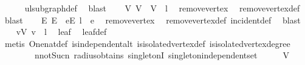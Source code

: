 \begin{isabellebody}
\ \ \ \ \isamarkupfalse%
\ ulsubgraph{\isacharunderscore}{\kern0pt}def\ \isamarkupfalse%
\ blast\isanewline
\ \ \isamarkupfalse%
\ V{\isacharprime}{\kern0pt}{\isacharcolon}{\kern0pt}\ {\isachardoublequoteopen}V{\isacharprime}{\kern0pt}\ {\isacharequal}{\kern0pt}\ V\ {\isacharminus}{\kern0pt}\ {\isacharbraceleft}{\kern0pt}l{\isacharbraceright}{\kern0pt}{\isachardoublequoteclose}\ \isamarkupfalse%
\ remove{\isacharunderscore}{\kern0pt}vertex\ \isamarkupfalse%
\ remove{\isacharunderscore}{\kern0pt}vertex{\isacharunderscore}{\kern0pt}def\ \isamarkupfalse%
\ blast\isanewline
\ \ \isamarkupfalse%
\ E{\isacharprime}{\kern0pt}{\isacharcolon}{\kern0pt}\ {\isachardoublequoteopen}E{\isacharprime}{\kern0pt}\ {\isacharequal}{\kern0pt}\ {\isacharbraceleft}{\kern0pt}e{\isasymin}E{\isachardot}{\kern0pt}\ l\ {\isasymnotin}\ e{\isacharbraceright}{\kern0pt}{\isachardoublequoteclose}\ \isamarkupfalse%
\ remove{\isacharunderscore}{\kern0pt}vertex\ \isamarkupfalse%
\ remove{\isacharunderscore}{\kern0pt}vertex{\isacharunderscore}{\kern0pt}def\ incident{\isacharunderscore}{\kern0pt}def\ \isamarkupfalse%
\ blast\isanewline
\ \ \isamarkupfalse%
\ {\isachardoublequoteopen}{\isasymexists}v{\isasymin}V{\isachardot}{\kern0pt}\ v\ {\isasymnoteq}\ l{\isachardoublequoteclose}\ \isamarkupfalse%
\ leaf\ \isamarkupfalse%
\ leaf{\isacharunderscore}{\kern0pt}def\isanewline
\ \ \ \ \isamarkupfalse%
\ {\isacharparenleft}{\kern0pt}metis\ One{\isacharunderscore}{\kern0pt}nat{\isacharunderscore}{\kern0pt}def\ is{\isacharunderscore}{\kern0pt}independent{\isacharunderscore}{\kern0pt}alt\ is{\isacharunderscore}{\kern0pt}isolated{\isacharunderscore}{\kern0pt}vertex{\isacharunderscore}{\kern0pt}def\ is{\isacharunderscore}{\kern0pt}isolated{\isacharunderscore}{\kern0pt}vertex{\isacharunderscore}{\kern0pt}degree{}\isanewline
\ \ \ \ \ \ \ \ n{\isacharunderscore}{\kern0pt}not{\isacharunderscore}{\kern0pt}Suc{\isacharunderscore}{\kern0pt}n\ radius{\isacharunderscore}{\kern0pt}obtains\ singletonI\ singleton{\isacharunderscore}{\kern0pt}independent{\isacharunderscore}{\kern0pt}set{\isacharparenright}{\kern0pt}\isanewline
\ \ \isamarkupfalse%
\ \isamarkupfalse%
\ {\isachardoublequoteopen}V{\isacharprime}{\kern0pt}\ {\isasymnoteq}\ {\isacharbraceleft}{\kern0pt}{\isacharbraceright}{\kern0pt}{\isachardoublequoteclose}\ \isamarkupfalse%

\end{isabellebody}
